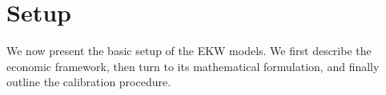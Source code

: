 \section{Setup}
We now present the basic setup of the EKW models. We first describe the economic framework, then turn to its mathematical formulation, and finally outline the calibration procedure. 






